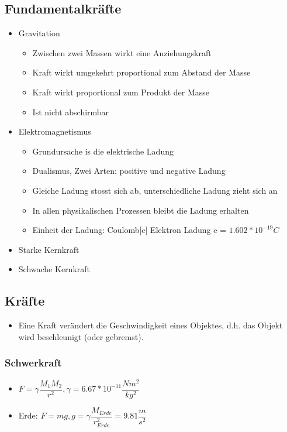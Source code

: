 \documentclass[8pt,a4paper]{scrartcl}
\begin{document}
\begin{multicols*}{3}
    		\subsection{Fundamentalkräfte}
			\begin{itemize}\itemsep0pt				
				\item Gravitation
				\begin{itemize}\itemsep0pt				
					\item Zwischen zwei Massen wirkt eine Anziehungskraft
					\item Kraft wirkt umgekehrt proportional zum Abstand der Masse
					\item Kraft wirkt proportional zum Produkt der Masse
					\item Ist nicht abschirmbar
				\end{itemize}
				\item Elektromagnetismus				
				\begin{itemize}\itemsep0pt				
					\item Grundursache is die elektrische Ladung
					\item Dualismus, Zwei Arten: positive und negative Ladung
					\item Gleiche Ladung stosst sich ab, unterschiedliche Ladung zieht sich an
					\item In allen physikalischen Prozessen bleibt die Ladung erhalten
					\item Einheit der Ladung: Coulomb[c] Elektron Ladung e = $1.602*10^{-19}C$
				\end{itemize}
				\item Starke Kernkraft		
				\item Schwache Kernkraft
			\end{itemize}
			
			\subsection{Kräfte}
				\begin{itemize}\itemsep0pt					
					\item Eine Kraft verändert die Geschwindigkeit eines Objektes, d.h. das Objekt wird beschleunigt (oder gebremst). 
				\end{itemize}
				\subsubsection{Schwerkraft}
					\begin{itemize}\itemsep0pt				
						\item $F=\gamma\dfrac{M_{1}M_{2}}{r^{2}}, \gamma = 6.67*10^{-11}\dfrac{Nm^{2}}{kg^{2}}$
						\item Erde: $F =mg, g = \gamma\dfrac{M_{Erde}}{r_{Erde}^{2}}=9.81\dfrac{m}{s^{2}}$
					\end{itemize}

\end{multicols*}
\end{document}
